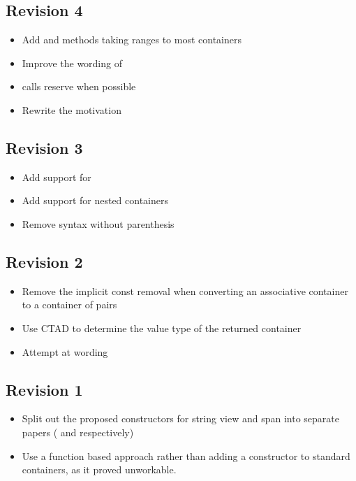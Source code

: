 \documentclass{wg21}
\begin{document}
\subsection*{Revision 4}
\begin{itemize}
    \item Add  and methods taking ranges to most containers
    \item Improve the wording of 
    \item {} calls reserve when possible
    \item Rewrite the motivation
\end{itemize}

\subsection*{Revision 3}
\begin{itemize}
    \item Add support for 
    \item Add support for nested containers
    \item Remove syntax without parenthesis
\end{itemize}

\subsection*{Revision 2}
\begin{itemize}
    \item Remove the implicit const removal when converting an associative container to a container of pairs
    \item Use CTAD to determine the value type of the returned container
    \item Attempt at wording
\end{itemize}

\subsection*{Revision 1}
\begin{itemize}
    \item Split out the proposed constructors for string view and span into separate papers (\cite{P1391} and \cite{P1394} respectively)
    \item Use a function based approach rather than adding a constructor to standard containers, as it proved unworkable.
\end{itemize}
\end{document}
